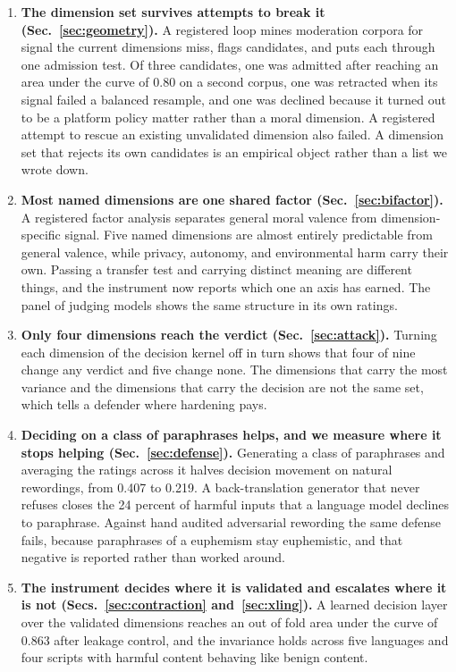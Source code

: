 \documentclass[journal]{IEEEtran}
\begin{document}
\begin{enumerate}
\item \textbf{The dimension set survives attempts to break it
(Sec.~\ref{sec:geometry}).} A registered loop mines moderation corpora for
signal the current dimensions miss, flags candidates, and puts each through
one admission test. Of three candidates, one was admitted after reaching an
area under the curve of 0.80 on a second corpus, one was retracted when its
signal failed a balanced resample, and one was declined because it turned out
to be a platform policy matter rather than a moral dimension. A registered
attempt to rescue an existing unvalidated dimension also failed. A dimension
set that rejects its own candidates is an empirical object rather than a
list we wrote down.
\item \textbf{Most named dimensions are one shared factor
(Sec.~\ref{sec:bifactor}).} A registered factor analysis separates general
moral valence from dimension-specific signal. Five named dimensions are
almost entirely predictable from general valence, while privacy, autonomy,
and environmental harm carry their own. Passing a transfer test and carrying
distinct meaning are different things, and the instrument now reports which
one an axis has earned. The panel of judging models shows the same structure
in its own ratings.
\item \textbf{Only four dimensions reach the verdict
(Sec.~\ref{sec:attack}).} Turning each dimension of the decision kernel off
in turn shows that four of nine change any verdict and five change none. The
dimensions that carry the most variance and the dimensions that carry the
decision are not the same set, which tells a defender where hardening pays.
\item \textbf{Deciding on a class of paraphrases helps, and we measure where
it stops helping (Sec.~\ref{sec:defense}).} Generating a class of paraphrases
and averaging the ratings across it halves decision movement on natural
rewordings, from 0.407 to 0.219. A back-translation generator that never
refuses closes the 24 percent of harmful inputs that a language model
declines to paraphrase. Against hand audited adversarial rewording the same
defense fails, because paraphrases of a euphemism stay euphemistic, and that
negative is reported rather than worked around.
\item \textbf{The instrument decides where it is validated and escalates
where it is not (Secs.~\ref{sec:contraction} and~\ref{sec:xling}).} A learned
decision layer over the validated dimensions reaches an out of fold area
under the curve of 0.863 after leakage control, and the invariance holds
across five languages and four scripts with harmful content behaving like
benign content.
\end{enumerate}
\end{document}
